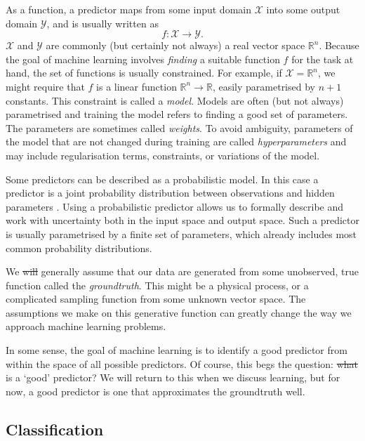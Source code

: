 \documentclass[11pt, a4paper]{book}
\newcommand{\defn}[1]{\emph{#1}}
\providecommand{\DIFaddtex}[1]{{\protect\color{blue}\uwave{#1}}} %
\providecommand{\DIFdeltex}[1]{{\protect\color{red}\sout{#1}}}                      %
\providecommand{\DIFaddbegin}{} %
\providecommand{\DIFaddend}{} %
\providecommand{\DIFdelbegin}{} %
\providecommand{\DIFdelend}{} %
\providecommand{\DIFadd}[1]{\texorpdfstring{\DIFaddtex{#1}}{#1}} %
\providecommand{\DIFdel}[1]{\texorpdfstring{\DIFdeltex{#1}}{}} %
\newcommand{\DIFscaledelfig}{0.5}
\newlength{\DIFdelgraphicswidth} %
\newlength{\DIFdelgraphicsheight} %
\newcommand{\DIFaddincludegraphics}[2][]{{\color{blue}\fbox{\DIFOincludegraphics[#1]{#2}}}} %
\newcommand{\DIFdelincludegraphics}[2][]{%
\sbox{\DIFdelgraphicsbox}{\DIFOincludegraphics[#1]{#2}}%
\settoboxwidth{\DIFdelgraphicswidth}{\DIFdelgraphicsbox} %
\settoboxtotalheight{\DIFdelgraphicsheight}{\DIFdelgraphicsbox} %
\scalebox{\DIFscaledelfig}{%
\parbox[b]{\DIFdelgraphicswidth}{\usebox{\DIFdelgraphicsbox}\\[-\baselineskip] \rule{\DIFdelgraphicswidth}{0em}}\llap{\resizebox{\DIFdelgraphicswidth}{\DIFdelgraphicsheight}{%
\setlength{\unitlength}{\DIFdelgraphicswidth}%
\begin{picture}(1,1)%
\thicklines\linethickness{2pt} %
{\color[rgb]{1,0,0}\put(0,0){\framebox(1,1){}}}%
{\color[rgb]{1,0,0}\put(0,0){\line( 1,1){1}}}%
{\color[rgb]{1,0,0}\put(0,1){\line(1,-1){1}}}%
\end{picture}%
}\hspace*{3pt}}} %
} %
\DeclareRobustCommand{\DIFaddbegin}{\DIFOaddbegin \let\includegraphics\DIFaddincludegraphics} %
\DeclareRobustCommand{\DIFaddend}{\DIFOaddend \let\includegraphics\DIFOincludegraphics} %
\DeclareRobustCommand{\DIFdelbegin}{\DIFOdelbegin \let\includegraphics\DIFdelincludegraphics} %
\DeclareRobustCommand{\DIFdelend}{\DIFOaddend \let\includegraphics\DIFOincludegraphics} %
\begin{document}
        As a function, a predictor maps from some input domain $\mathcal X$ into some output domain $\mathcal Y$, and is usually written as
        \begin{equation}
            f : \mathcal X \to \mathcal Y.
        \end{equation}
        $\mathcal X$ and $\mathcal Y$ are commonly (but certainly not always) a real vector space $\mathbb R^n$. Because the goal of machine learning involves \emph{finding} a suitable function $f$ for the task at hand, the set of functions is usually constrained. For example, if $\mathcal X = \mathbb{R}^n$, we might require that $f$ is a linear function $\mathbb R^n \to \mathbb R$, easily parametrised by $n + 1$ constants. This constraint is called a \defn{model}. Models are often (but not always) parametrised and training the model refers to finding a good set of parameters. The parameters are sometimes called \defn{weights}. To avoid ambiguity, parameters of the model that are not changed during training are called \defn{hyperparameters} and may include regularisation terms, constraints, or variations of the model.

        Some predictors can be described as a probabilistic model. In this case a predictor is a joint probability distribution between observations and hidden parameters \citep{deisenroth_mathematics_2020}. Using a probabilistic predictor allows us to formally describe and work with uncertainty both in the input space and output space. Such a predictor is usually parametrised by a finite set of parameters, which already includes most common probability distributions.

        We \DIFdelbegin \DIFdel{will }\DIFdelend generally assume that our data are generated from some unobserved, true function called the \defn{groundtruth}. This might be a physical process, or a complicated sampling function from some unknown vector space. The assumptions we make on this generative function can greatly change the way we approach machine learning problems.

        In some sense, the goal of machine learning is to identify a good predictor from within the space of all possible predictors. Of course, this begs the question: \DIFdelbegin \DIFdel{what }\DIFdelend \DIFaddbegin \DIFadd{What }\DIFaddend is a `good' predictor? We will return to this when we discuss learning, but for now, a good predictor is one that approximates the groundtruth well.

    \subsection{Classification}
    \label{sec:classification}
\end{document}
